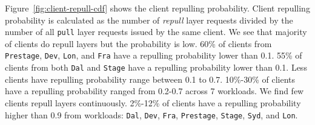 Figure~\ref{fig:client-repull-cdf} shows the client repulling probability.
Client repulling probability is calculated as the number of \emph{repull} layer requests divided by
the number of all \texttt{pull} layer requests issued by the same client.
We see that majority of clients do repull layers but the probability is low.
60\% of clients from \texttt{Prestage}, \texttt{Dev}, \texttt{Lon}, and \texttt{Fra} have a repulling probability lower than 0.1.
55\% of clients from both \texttt{Dal} and \texttt{Stage} have a repulling probability lower than 0.1.
Less clients have repulling probability range between 0.1 to 0.7.
10\%-30\% of clients have a repulling probability ranged from 0.2-0.7 across 7 workloads.
We find few clients repull layers continuously.
2\%-12\% of clients have a repulling probability higher than 0.9 from workloads:
\texttt{Dal}, \texttt{Dev}, \texttt{Fra}, \texttt{Prestage},
\texttt{Stage}, \texttt{Syd}, and \texttt{Lon}.




